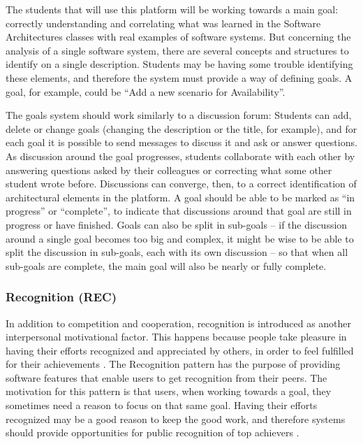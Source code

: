 The students that will use this platform will be working towards a main goal: correctly understanding and correlating what was learned in the Software Architectures classes with real examples of software systems. But concerning the analysis of a single software system, there are several concepts and structures to identify on a single description. Students may be having some trouble identifying these elements, and therefore the system must provide a way of defining goals. A goal, for example, could be ``Add a new scenario for Availability''. 

The goals system should work similarly to a discussion forum: Students can add, delete or change goals (changing the description or the title, for example), and for each goal it is possible to send messages to discuss it and ask or answer questions. As discussion around the goal progresses, students collaborate with each other by answering questions asked by their colleagues or correcting what some other student wrote before. Discussions can converge, then, to a correct identification of architectural elements in the platform. A goal should be able to be marked as ``in progress'' or ``complete'', to indicate that discussions around that goal are still in progress or have finished. 
Goals can also be split in sub-goals – if the discussion around a single goal becomes too big and complex, it might be wise to be able to split the discussion in sub-goals, each with its own discussion – so that when all sub-goals are complete, the main goal will also be nearly or fully complete. 

\subsubsection{Recognition (REC)}

In addition to competition and cooperation, recognition is introduced as another interpersonal motivational factor. This happens because people take pleasure in having their efforts recognized and appreciated by others, in order to feel fulfilled for their achievements \cite{malone1987making}. 
The Recognition pattern has the purpose of providing software features that enable users to get recognition from their peers. The motivation for this pattern is that users, when working towards a goal, they sometimes need a reason to focus on that same goal. Having their efforts recognized may be a good reason to keep the good work, and therefore systems should provide opportunities for public recognition of top achievers \cite{oduor2014persuasive}. 

